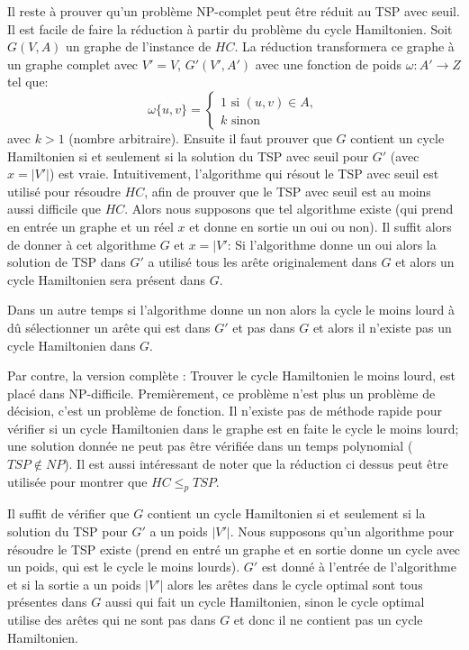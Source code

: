 \documentclass[../main.tex]{subfiles}
\begin{document}
Il reste à prouver qu'un problème NP-complet peut être réduit au TSP avec seuil. Il est facile de faire la réduction à partir du problème du cycle Hamiltonien. Soit $G(V,A)$ un graphe de l'instance de $HC$. La réduction transformera ce graphe à un graphe complet avec $V'=V$, $G'(V', A')$ avec une fonction de poids $\omega: A' \rightarrow Z$ tel que:
\[
\omega \{u, v\} = \begin{cases}
\text{1 si } (u,v)\in A,\\
k \text{ sinon}
\end{cases}
\]
avec $k > 1$ (nombre arbitraire). Ensuite il faut prouver que $G$ contient un cycle Hamiltonien si et seulement si la solution du TSP avec seuil pour $G'$ (avec $x=|V'|$) est vraie. Intuitivement, l'algorithme qui résout le TSP avec seuil est utilisé pour résoudre $HC$, afin de prouver que le TSP avec seuil est au moins aussi difficile que $HC$. Alors nous supposons que tel algorithme existe (qui prend en entrée un graphe et un réel $x$ et donne en sortie un oui ou non). Il suffit alors de donner à cet algorithme $G$ et $x=|V'$: Si l'algorithme donne un oui alors la solution de TSP dans $G'$ a utilisé tous les arête originalement dans $G$ et alors un cycle Hamiltonien sera présent dans $G$.

Dans un autre temps si l'algorithme donne un non alors la cycle le moins lourd à dû sélectionner un arête qui est dans $G'$ et pas dans $G$ et alors il n'existe pas un cycle Hamiltonien dans $G$.

Par contre, la version \og complète \fg{}: Trouver le cycle Hamiltonien le moins lourd, est placé dans NP-difficile. Premièrement, ce problème n'est plus un problème de décision, c'est un problème de fonction. Il n'existe pas de méthode rapide pour vérifier si un cycle Hamiltonien dans le graphe est en faite le cycle le moins lourd; une solution donnée ne peut pas être vérifiée dans un temps polynomial ($TSP \notin NP$). Il est aussi intéressant de noter que la réduction ci dessus peut être utilisée pour montrer que $HC \leq _p TSP$.

Il suffit de vérifier que $G$ contient un cycle Hamiltonien si et seulement si la solution du TSP pour $G'$ a un poids $|V'|$. Nous supposons qu'un algorithme pour résoudre le TSP existe (prend en entré un graphe et en sortie donne un cycle avec un poids, qui est le cycle le moins lourds). $G'$ est donné à l'entrée de l'algorithme et si la sortie a un poids $|V'|$ alors les arêtes dans le cycle optimal sont tous présentes dans $G$ aussi qui fait un cycle Hamiltonien, sinon le cycle optimal utilise des arêtes qui ne sont pas dans $G$ et donc il ne contient pas un cycle Hamiltonien.
\end{document}
